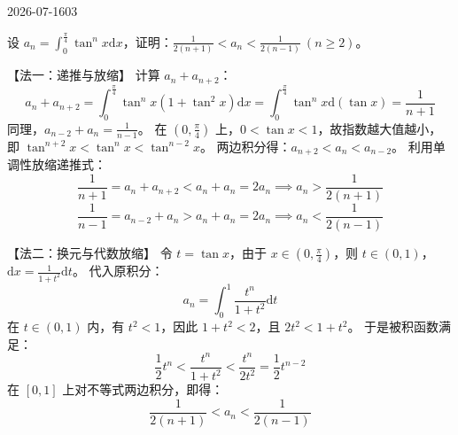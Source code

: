 \begin{mistake}{2026-07-16}{03}

\begin{problemcontent}
设 \(a_n = \int_0^{\frac{\pi}{4}} \tan^n x \mathrm{d}x\)，证明：\(\frac{1}{2(n+1)} < a_n < \frac{1}{2(n-1)} \ (n \ge 2)\)。
\end{problemcontent}

\begin{solutioncontent}
【法一：递推与放缩】
计算 \(a_n + a_{n+2}\)：
\[ a_n + a_{n+2} = \int_0^{\frac{\pi}{4}} \tan^n x (1 + \tan^2 x) \mathrm{d}x = \int_0^{\frac{\pi}{4}} \tan^n x \mathrm{d}(\tan x) = \frac{1}{n+1} \]
同理，\(a_{n-2} + a_n = \frac{1}{n-1}\)。
在 \((0, \frac{\pi}{4})\) 上，\(0 < \tan x < 1\)，故指数越大值越小，即 \(\tan^{n+2} x < \tan^n x < \tan^{n-2} x\)。
两边积分得：\(a_{n+2} < a_n < a_{n-2}\)。
利用单调性放缩递推式：
\[ \frac{1}{n+1} = a_n + a_{n+2} < a_n + a_n = 2a_n \implies a_n > \frac{1}{2(n+1)} \]
\[ \frac{1}{n-1} = a_{n-2} + a_n > a_n + a_n = 2a_n \implies a_n < \frac{1}{2(n-1)} \]

【法二：换元与代数放缩】
令 \(t = \tan x\)，由于 \(x \in (0, \frac{\pi}{4})\)，则 \(t \in (0, 1)\)，\(\mathrm{d}x = \frac{1}{1+t^2} \mathrm{d}t\)。
代入原积分：
\[ a_n = \int_0^1 \frac{t^n}{1+t^2} \mathrm{d}t \]
在 \(t \in (0, 1)\) 内，有 \(t^2 < 1\)，因此 \(1+t^2 < 2\)，且 \(2t^2 < 1+t^2\)。
于是被积函数满足：
\[ \frac{1}{2} t^n < \frac{t^n}{1+t^2} < \frac{t^n}{2t^2} = \frac{1}{2} t^{n-2} \]
在 \([0, 1]\) 上对不等式两边积分，即得：
\[ \frac{1}{2(n+1)} < a_n < \frac{1}{2(n-1)} \]
\end{solutioncontent}


\end{mistake}
